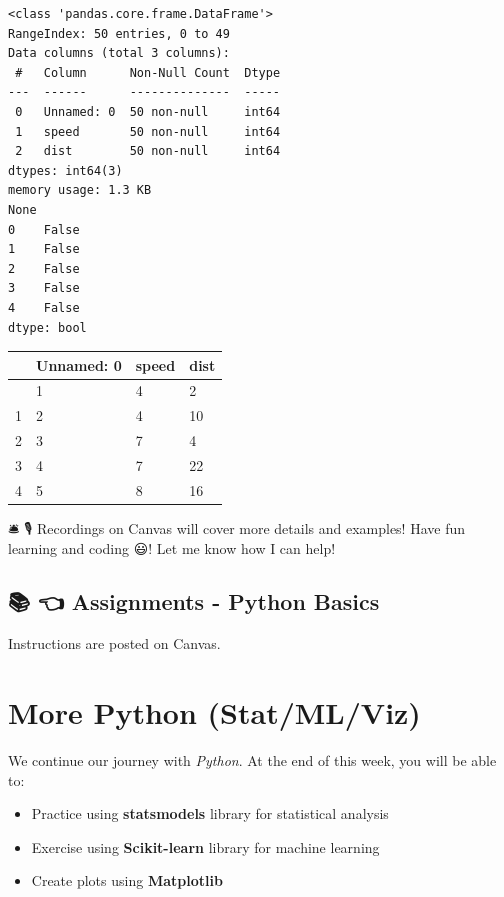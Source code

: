 \documentclass[
  letterpaper,
  DIV=11,
  numbers=noendperiod]{scrreprt}
\providecommand{\tightlist}{%
  \setlength{\itemsep}{0pt}\setlength{\parskip}{0pt}}\usepackage{longtable,booktabs,array}
\begin{document}
\begin{verbatim}
<class 'pandas.core.frame.DataFrame'>
RangeIndex: 50 entries, 0 to 49
Data columns (total 3 columns):
 #   Column      Non-Null Count  Dtype
---  ------      --------------  -----
 0   Unnamed: 0  50 non-null     int64
 1   speed       50 non-null     int64
 2   dist        50 non-null     int64
dtypes: int64(3)
memory usage: 1.3 KB
None
0    False
1    False
2    False
3    False
4    False
dtype: bool
\end{verbatim}

\begin{longtable}[]{@{}llll@{}}
\toprule\noalign{}
& Unnamed: 0 & speed & dist \\
\midrule\noalign{}
\endhead
\bottomrule\noalign{}
\endlastfoot
0 & 1 & 4 & 2 \\
1 & 2 & 4 & 10 \\
2 & 3 & 7 & 4 \\
3 & 4 & 7 & 22 \\
4 & 5 & 8 & 16 \\
\end{longtable}

🛎 🎙️ Recordings on Canvas will cover more details and examples! Have fun
learning and coding 😃! Let me know how I can help!

\hypertarget{assignments---python-basics}{%
\section*{📚 👈 Assignments - Python
Basics}\label{assignments---python-basics}}


Instructions are posted on Canvas.

\hypertarget{more-python-statmlviz}{%
\chapter*{More Python (Stat/ML/Viz)}\label{more-python-statmlviz}}


We continue our journey with \emph{Python}. At the end of this week, you
will be able to:

\begin{itemize}
\tightlist
\item
  Practice using \textbf{statsmodels} library for statistical analysis
\item
  Exercise using \textbf{Scikit-learn} library for machine learning
\item
  Create plots using \textbf{Matplotlib}
\end{itemize}
\end{document}
